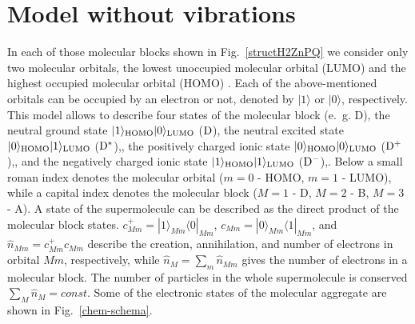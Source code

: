 \documentclass[12pt,twoside,a4paper]{report}
\begin{document}
\section{Model without vibrations}  
\label{chem-model}
In each of those
molecular blocks shown in Fig.~\ref{structH2ZnPQ} we consider only two molecular orbitals, the lowest
unoccupied molecular orbital (LUMO) and the highest occupied molecular
orbital (HOMO) \cite{gout63}. Each of the above-mentioned orbitals can be occupied by
an electron or not, denoted  by $|1\rangle$ or $|0\rangle$, respectively.  This
model allows to describe four states of the molecular block (e.~g. D), 
the neutral 
         ground  state $|1\rangle_{\rm HOMO}|0\rangle_{\rm LUMO}$ (${\rm D  }$), 
the neutral 
         excited state $|0\rangle_{\rm HOMO}|1\rangle_{\rm LUMO}$ (${\rm D^*}$),, 
the positively charged 
           ionic state $|0\rangle_{\rm HOMO}|0\rangle_{\rm LUMO}$ (${\rm D^+}$),, and 
the negatively charged
           ionic state $|1\rangle_{\rm HOMO}|1\rangle_{\rm LUMO}$ (${\rm D^-}$),.  
Below a small roman index
denotes the molecular orbital ($m=0$ - HOMO, $m=1$ - LUMO), while a
capital index denotes the molecular block 
($M{}=1$ - D, $M{}=2$ - B, $M{}=3$ - A). 
A state of the supermolecule can be described 
as the direct product of the molecular block states.
%
$c^+_{M{}m}=|1\rangle_{M{}m}\langle0|_{M{}m}$, 
$c_{M{}m}=|0\rangle_{M{}m}\langle1|_{M{}m}$, and
$\hat n_{M{}m}=c^+_{M{}m}c_{M{}m}$ describe the creation, annihilation, and number of electrons in
orbital ${M{}m}$, respectively, while 
$\hat n_M{}=\sum_m \hat n_{M{}m}$ gives the number of electrons in
a molecular block.  The number of particles in the whole
supermolecule is conserved 
$\sum_M{} {\hat  n}_M{}=const$.
Some of the  electronic states of the molecular aggregate are shown in Fig.~\ref{chem-schema}.
\end{document}
